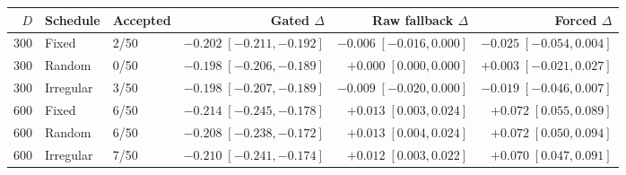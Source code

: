 \begin{tabular}{rllrrr}
\toprule
$D$ & Schedule & Accepted & Gated $\Delta$ & Raw fallback $\Delta$ & Forced $\Delta$ \\
\midrule
300 & Fixed & 2/50 & $-0.202\;[-0.211,-0.192]$ & $-0.006\;[-0.016,0.000]$ & $-0.025\;[-0.054,0.004]$ \\
300 & Random & 0/50 & $-0.198\;[-0.206,-0.189]$ & $+0.000\;[0.000,0.000]$ & $+0.003\;[-0.021,0.027]$ \\
300 & Irregular & 3/50 & $-0.198\;[-0.207,-0.189]$ & $-0.009\;[-0.020,0.000]$ & $-0.019\;[-0.046,0.007]$ \\
600 & Fixed & 6/50 & $-0.214\;[-0.245,-0.178]$ & $+0.013\;[0.003,0.024]$ & $+0.072\;[0.055,0.089]$ \\
600 & Random & 6/50 & $-0.208\;[-0.238,-0.172]$ & $+0.013\;[0.004,0.024]$ & $+0.072\;[0.050,0.094]$ \\
600 & Irregular & 7/50 & $-0.210\;[-0.241,-0.174]$ & $+0.012\;[0.003,0.022]$ & $+0.070\;[0.047,0.091]$ \\
\bottomrule
\end{tabular}
